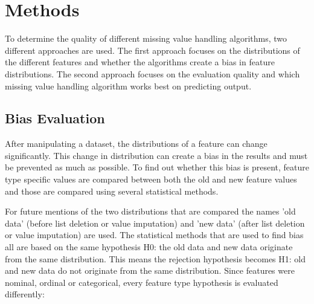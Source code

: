 \documentclass[10pt,a4paper]{article}
\begin{document}
	
	\section{Methods}
	\label{sec:Methods}
	
	To determine the quality of different missing value handling algorithms, two different approaches are used. The first approach focuses on the distributions of the different features and whether the algorithms create a bias in feature distributions. The second approach focuses on the evaluation quality and which missing value handling algorithm works best on predicting output.
	
	\subsection{Bias Evaluation}
	\label{subsec:BiasEvaluation}

	After manipulating a dataset, the distributions of a feature can change significantly. This change in distribution can create a bias in the results and must be prevented as much as possible. To find out whether this bias is present, feature type specific values are compared between both the old and new feature values and those are compared using several statistical methods.
	
	For future mentions of the two distributions that are compared the names 'old data' (before list deletion or value imputation) and 'new data' (after list deletion or value imputation) are used. The statistical methods that are used to find bias all are based on the same hypothesis H0: the old data and new data originate from the same distribution. This means the rejection hypothesis becomes H1: old and new data do not originate from the same distribution. Since features were nominal, ordinal or categorical, every feature type hypothesis is evaluated differently:
	
\end{document}
